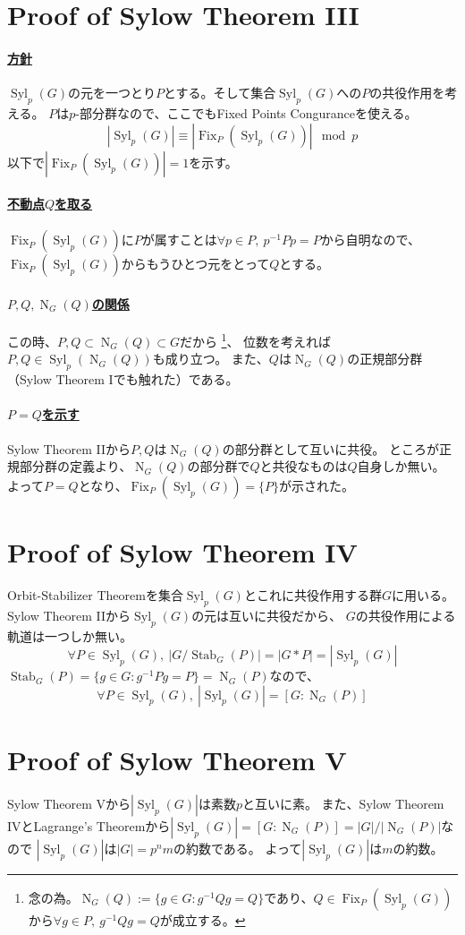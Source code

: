 \documentclass[a4paper]{jarticle}
\newcommand{\Stab}{\operatorname{Stab}}
\newcommand{\Fix}{\operatorname{Fix}}
\newcommand{\Norm}{\operatorname{N}}
\newcommand{\Syl}{\operatorname{Syl}}
\newcommand{\ulpar}[1]{\paragraph{\underline{#1}}}
\begin{document}
    \section{Proof of Sylow Theorem III}
    \ulpar{方針}
    $\Syl_p(G)$の元を一つとり$P$とする。そして集合$\Syl_p(G)$への$P$の共役作用を考える。
    $P$は$p$-部分群なので、ここでもFixed Points Conguranceを使える。
    \[ |\Syl_p(G)| \equiv |\Fix_P(\Syl_p(G))| \mod p\]
    以下で$|\Fix_P(\Syl_p(G))|=1$を示す。

    \ulpar{不動点$Q$を取る}
    $\Fix_P(\Syl_p(G))$に$P$が属すことは$\forall p \in P,~ p^{-1}Pp=P$から自明なので、
    $\Fix_P(\Syl_p(G))$からもうひとつ元をとって$Q$とする。

    \ulpar{$P, Q, \Norm_G(Q)$の関係}
    この時、$P,Q \subset \Norm_G(Q) \subset G$だから
    \footnote{念の為。$\Norm_G(Q):=\{ g \in G : g^{-1}Qg=Q \}$であり、$Q \in \Fix_P(\Syl_p(G))$から$\forall g \in P,~ g^{-1}Qg=Q$が成立する。}、
    位数を考えれば$P,Q \in \Syl_p(\Norm_G(Q))$も成り立つ。
    また、$Q$は$\Norm_G(Q)$の正規部分群（Sylow Theorem Iでも触れた）である。

    \ulpar{$P=Q$を示す}
    Sylow Theorem IIから$P,Q$は$\Norm_G(Q)$の部分群として互いに共役。
    ところが正規部分群の定義より、$\Norm_G(Q)$の部分群で$Q$と共役なものは$Q$自身しか無い。
    よって$P=Q$となり、$\Fix_P(\Syl_p(G))=\{ P \}$が示された。
    \QED

    \section{Proof of Sylow Theorem IV}
    Orbit-Stabilizer Theoremを集合$\Syl_p(G)$とこれに共役作用する群$G$に用いる。
    Sylow Theorem IIから$\Syl_p(G)$の元は互いに共役だから、
    $G$の共役作用による軌道は一つしか無い。
    \[ \forall P \in \Syl_p(G),~ |G/\Stab_G(P)|=|G \ast P|=|\Syl_p(G)|\]
    $\Stab_G(P)=\{ g \in G : g^{-1}Pg=P \}=\Norm_G(P)$なので、
    \[ \forall P \in \Syl_p(G),~ |\Syl_p(G)|=[G:\Norm_G(P)] \]
    \QED

    \section{Proof of Sylow Theorem V}
    Sylow Theorem Vから$|\Syl_p(G)|$は素数$p$と互いに素。
    また、Sylow Theorem IVとLagrange's Theoremから$|\Syl_p(G)|=[G:\Norm_G(P)]=|G|/|\Norm_G(P)|$なので
    $|\Syl_p(G)|$は$|G|=p^n m$の約数である。
    よって$|\Syl_p(G)|$は$m$の約数。
    \QED
\end{document}
